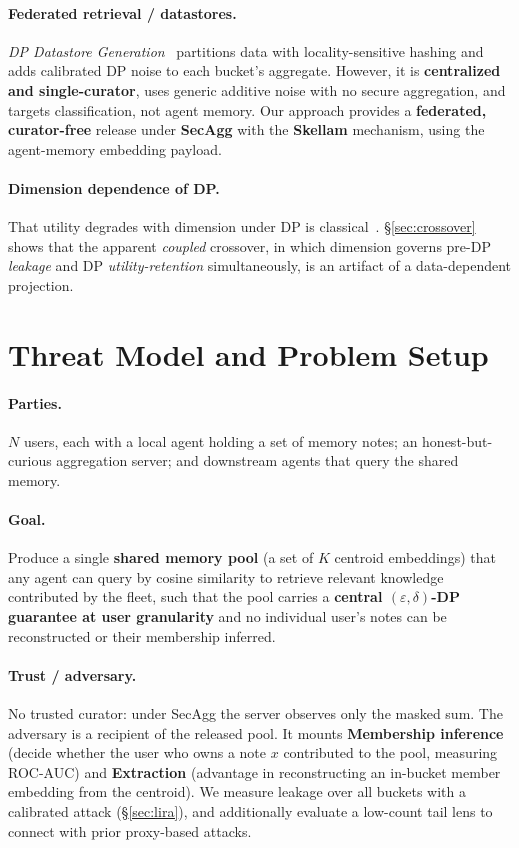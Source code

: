 \documentclass[conference]{IEEEtran}
\theoremstyle{remark}
\newcommand{\eps}{\varepsilon}
\newcommand{\secref}[1]{\S\ref{#1}}
\begin{document}
\paragraph{Federated retrieval / datastores.} \emph{DP Datastore Generation}~\cite{abouelenein2026dpdatastore} partitions data with locality-sensitive hashing and adds calibrated DP noise to each bucket's aggregate. However, it is \textbf{centralized and single-curator}, uses generic additive noise with no secure aggregation, and targets classification, not agent memory. Our approach provides a \textbf{federated, curator-free} release under \textbf{SecAgg} with the \textbf{Skellam} mechanism, using the agent-memory embedding payload.

\paragraph{Dimension dependence of DP.} That utility degrades with dimension under DP is classical~\cite{bassily2014erm,chen2022price}. \secref{sec:crossover} shows that the apparent \emph{coupled} crossover, in which dimension governs pre-DP \emph{leakage} and DP \emph{utility-retention} simultaneously, is an artifact of a data-dependent projection.

\section{Threat Model and Problem Setup}\label{sec:threat}

\paragraph{Parties.} $N$ users, each with a local agent holding a set of memory notes; an honest-but-curious aggregation server; and downstream agents that query the shared memory.

\paragraph{Goal.} Produce a single \textbf{shared memory pool} (a set of $K$ centroid embeddings) that any agent can query by cosine similarity to retrieve relevant knowledge contributed by the fleet, such that the pool carries a \textbf{central $(\eps, \delta)$-DP guarantee at user granularity} and no individual user's notes can be reconstructed or their membership inferred.

\paragraph{Trust / adversary.} No trusted curator: under SecAgg the server observes only the masked sum. The adversary is a recipient of the released pool. It mounts \textbf{Membership inference} (decide whether the user who owns a note $x$ contributed to the pool, measuring ROC-AUC) and \textbf{Extraction} (advantage in reconstructing an in-bucket member embedding from the centroid). We measure leakage over all buckets with a calibrated attack (\secref{sec:lira}), and additionally evaluate a low-count tail lens to connect with prior proxy-based attacks. 
\end{document}
